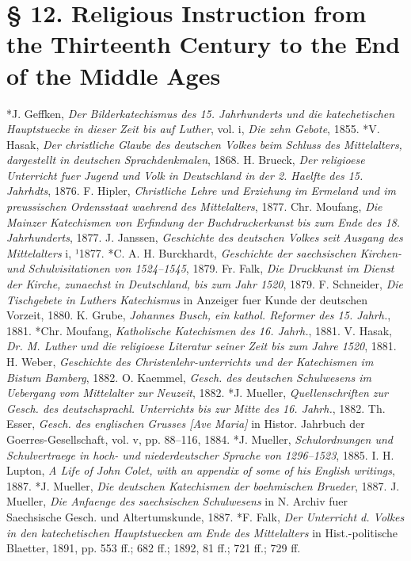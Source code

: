 \section[§ 12. Religious Instruction to the End of the Middle Ages]{§ 12. Religious Instruction from the Thirteenth Century to the End of the Middle Ages}

*J. Geffken, \emph{Der Bilderkatechismus des 15. Jahrhunderts und die katechetischen Hauptstuecke in dieser Zeit bis auf Luther}, vol. i, \emph{Die zehn Gebote}, 1855. *V. Hasak, \emph{Der christliche Glaube des deutschen Volkes beim Schluss des Mittelalters, dargestellt in deutschen Sprachdenkmalen}, 1868. H. Brueck, \emph{Der religioese Unterricht fuer Jugend und Volk in Deutschland in der 2. Haelfte des 15. Jahrhdts}, 1876. F. Hipler, \emph{Christliche Lehre und Erziehung im Ermeland und im preussischen Ordensstaat waehrend des Mittelalters}, 1877. Chr. Moufang, \emph{Die Mainzer Katechismen von Erfindung der Buchdruckerkunst bis zum Ende des 18. Jahrhunderts}, 1877. J. Janssen, \emph{Geschichte des deutschen Volkes seit Ausgang des Mittelalters} i, ¹1877. *C. A. H. Burckhardt, \emph{Geschichte der saechsischen Kirchen- und Schulvisitationen von 1524–1545}, 1879. Fr. Falk, \emph{Die Druckkunst im Dienst der Kirche, zunaechst in Deutschland, bis zum Jahr 1520}, 1879. F. Schneider, \emph{Die Tischgebete in Luthers Katechismus} in Anzeiger fuer Kunde der deutschen Vorzeit, 1880. K. Grube, \emph{Johannes Busch, ein kathol. Reformer des 15. Jahrh.}, 1881. *Chr. Moufang, \emph{Katholische Katechismen des 16. Jahrh.}, 1881. V. Hasak, \emph{Dr. M. Luther und die religioese Literatur seiner Zeit bis zum Jahre 1520}, 1881. H. Weber, \emph{Geschichte des Christenlehr-unterrichts und der Katechismen im Bistum Bamberg}, 1882. O. Kaemmel, \emph{Gesch. des deutschen Schulwesens im Uebergang vom Mittelalter zur Neuzeit}, 1882. *J. Mueller, \emph{Quellenschriften zur Gesch. des deutschsprachl. Unterrichts bis zur Mitte des 16. Jahrh.}, 1882. Th. Esser, \emph{Gesch. des englischen Grusses [Ave Maria]} in Histor. Jahrbuch der Goerres-Gesellschaft, vol. v, pp. 88–116, 1884. *J. Mueller, \emph{Schulordnungen und Schulvertraege in hoch- und niederdeutscher Sprache von 1296–1523}, 1885. I. H. Lupton, \emph{A Life of John Colet, with an appendix of some of his English writings}, 1887. *J. Mueller, \emph{Die deutschen Katechismen der boehmischen Brueder}, 1887. J. Mueller, \emph{Die Anfaenge des saechsischen Schulwesens} in N. Archiv fuer Saechsische Gesch. und Altertumskunde, 1887. *F. Falk, \emph{Der Unterricht d. Volkes in den katechetischen Hauptstuecken am Ende des Mittelalters} in Hist.-politische Blaetter, 1891, pp. 553 ff.; 682 ff.; 1892, 81 ff.; 721 ff.; 729 ff.
